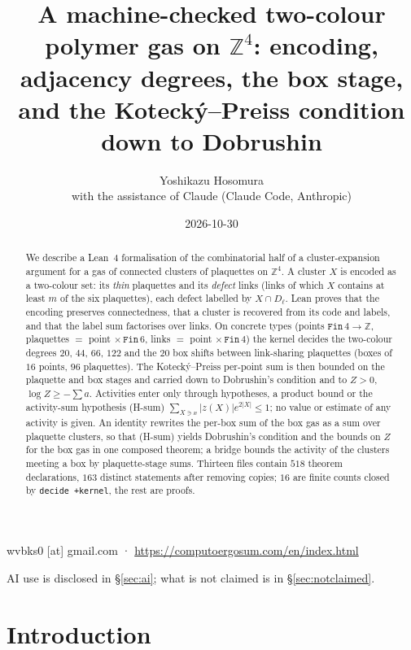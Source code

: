 \documentclass[11pt,a4paper]{article}
\title{A machine-checked two-colour polymer gas on $\mathbb{Z}^4$: encoding, adjacency degrees, the box stage, and the Kotecký--Preiss condition down to Dobrushin}
\author{Yoshikazu Hosomura\\[.3em]\normalsize with the assistance of Claude (Claude Code, Anthropic)}
\date{2026-10-30}
\theoremstyle{definition}
\theoremstyle{remark}
\begin{document}
\maketitle
\begin{center}\small wvbks0 [at] gmail.com · \url{https://computoergosum.com/en/index.html}\end{center}
\begin{center}\small AI use is disclosed in \S\ref{sec:ai}; what is not claimed is in \S\ref{sec:notclaimed}.\end{center}

\begin{abstract}
We describe a Lean~4 formalisation of the combinatorial half of a cluster-expansion argument for a gas of connected clusters of plaquettes on $\mathbb{Z}^4$. A cluster $X$ is encoded as a two-colour set: its \emph{thin} plaquettes and its \emph{defect} links (links of which $X$ contains at least $m$ of the six plaquettes), each defect labelled by $X\cap D_\ell$. Lean proves that the encoding preserves connectedness, that a cluster is recovered from its code and labels, and that the label sum factorises over links. On concrete types (points $\mathtt{Fin}\,4\to\mathbb{Z}$, plaquettes $=$ point $\times\,\mathtt{Fin}\,6$, links $=$ point $\times\,\mathtt{Fin}\,4$) the kernel decides the two-colour degrees $20$, $44$, $66$, $122$ and the $20$ box shifts between link-sharing plaquettes (boxes of $16$ points, $96$ plaquettes). The Kotecký--Preiss per-point sum is then bounded on the plaquette and box stages and carried down to Dobrushin's condition and to $Z>0$, $\log Z\ge-\sum a$. Activities enter only through hypotheses, a product bound or the activity-sum hypothesis (H-sum) $\sum_{X\ni x}|z(X)|e^{2|X|}\le1$; no value or estimate of any activity is given. An identity rewrites the per-box sum of the box gas as a sum over plaquette clusters, so that (H-sum) yields Dobrushin's condition and the bounds on $Z$ for the box gas in one composed theorem; a bridge bounds the activity of the clusters meeting a box by plaquette-stage sums. Thirteen files contain $518$ theorem declarations, $163$ distinct statements after removing copies; $16$ are finite counts closed by \texttt{decide +kernel}, the rest are proofs.
\end{abstract}

\section{Introduction}\label{sec:intro}
\end{document}
